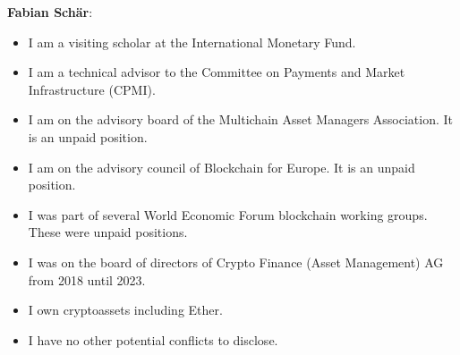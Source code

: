 \documentclass[12pt, letter paper]{article}
\begin{document}
\textbf{Fabian Sch\"{a}r}: 
\begin{itemize}
    \item I am a visiting scholar at the International Monetary Fund.
    \item I am a technical advisor to the Committee on Payments and Market Infrastructure (CPMI).
    \item I am on the advisory board of the Multichain Asset Managers Association. It is an unpaid position.
    \item I am on the advisory council of Blockchain for Europe. It is an unpaid position.
    \item I was part of several World Economic Forum blockchain working groups. These were unpaid positions.
    \item I was on the board of directors of Crypto Finance (Asset Management) AG from 2018 until 2023.
    \item I own cryptoassets including Ether.
    \item I have no other potential conflicts to disclose.
\end{itemize}
\end{document}

